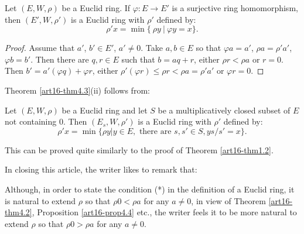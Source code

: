 \begin{proposition}\label{art16-prop4.4}
Let $(E, W,\rho)$ be a Euclid ring. If $\varphi : E \to E'$ is a surjective ring homomorphism, then $(E', W, \rho')$ is a Euclid ring with $\rho'$ defined by:
$$
\rho'x = \min \{~\rho y ~|~ \varphi y = x\}.
$$
\end{proposition}

\begin{proof}
Assume that $a'$, $b' \in E'$, $a' \neq 0$. Take $a,  b \in E$ so that $\varphi a = a'$, $\rho a = \rho' a'$, $\varphi b = b'$. Then there are $q, r \in E$ such that $b = a q + r$, either $\rho r <\rho a$ or $r =0$. Then $b' = a' (\varphi q) +\varphi r$, either $\rho'(\varphi r) \leqslant \rho r < \rho a = \rho' a'$ or $\varphi r = 0$. 
\end{proof}

Theorem \ref{art16-thm4.3}(ii) follows from:

\begin{proposition}\label{art16-prop4.5}
Let $(E, W , \rho)$ be a Euclid ring and let $S$ be a multiplicatively closed subset of $E$ not containing 0. Then $(E_s, W, \rho')$ is a Euclid ring with $\rho'$ defined by:
$$
\rho' x = \min \{\rho y | y \in E, \text{ there are } s, s' \in S, ys /s' = x\}.
$$
\end{proposition}

This can be proved quite similarly to the proof of Theorem \ref{art16-thm1.2}. 

In closing this article, the writer likes to remark that:

Although, in order to state the condition (*) in the definition of a Euclid ring, it is natural to extend $\rho$ so that $\rho 0 < \rho a$ for any $a \neq 0$, in view of Theorem \ref{art16-thm4.2}, Proposition \ref{art16-prop4.4} etc., the writer feels it to be more natural to extend $\rho$ so that $\rho 0 > \rho a$ for any $a \neq 0$.

\vfill\eject
~\phantom{a}
\thispagestyle{empty}
